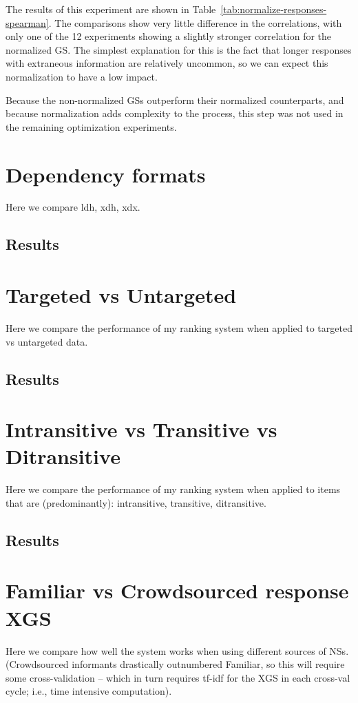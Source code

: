 The results of this experiment are shown in Table~\ref{tab:normalize-responses-spearman}. The comparisons show very little difference in the correlations, with only one of the 12 experiments showing a slightly stronger correlation for the normalized GS. The simplest explanation for this is the fact that longer responses with extraneous information are relatively uncommon, so we can expect this normalization to have a low impact. 

Because the non-normalized GSs outperform their normalized counterparts, and because normalization adds complexity to the process, this step was not used in the remaining optimization experiments.

\section{Dependency formats}
\label{section:experiment-dependency-formats}
Here we compare ldh, xdh, xdx.
\subsection{Results}
\label{subsection:dependency-formats-results}

\section{Targeted vs Untargeted}
\label{section:experiment-targeted}
Here we compare the performance of my ranking system when applied to targeted vs untargeted data.
\subsection{Results}
\label{subsection:targeted-results}

\section{Intransitive vs Transitive vs Ditransitive}
\label{section:experiment-transitive}
Here we compare the performance of my ranking system when applied to items that are (predominantly): intransitive, transitive, ditransitive.
\subsection{Results}
\label{subsection:transitive-results}

\section{Familiar vs Crowdsourced response XGS}
\label{section:experiment-crowdsource}
Here we compare how well the system works when using different sources of NSs. (Crowdsourced informants drastically outnumbered Familiar, so this will require some cross-validation -- which in turn requires tf-idf for the XGS in each cross-val cycle; i.e., time intensive computation).
